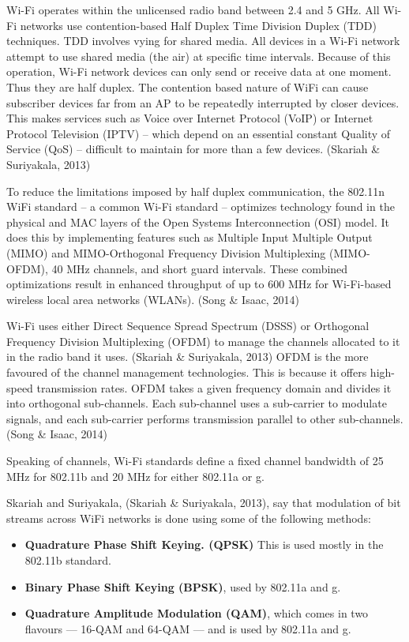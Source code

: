 \documentclass[12pt,svgnames,smaller]{article} %
\begin{document}
\begin{enumerate}
		Wi-Fi operates within the unlicensed radio band between 2.4 and 5 GHz. All Wi-Fi networks use contention-based Half Duplex Time Division Duplex (TDD) techniques. TDD involves vying for shared media. All devices in a Wi-Fi network attempt to use shared media (the air) at specific time intervals. Because of this operation, Wi-Fi network devices can only send or receive data at one moment. Thus they are half duplex. The contention based nature of WiFi can cause subscriber devices far from an AP to be repeatedly interrupted by closer devices. This makes services such as Voice over Internet Protocol (VoIP) or Internet Protocol Television (IPTV) – which depend on an essential constant Quality of Service (QoS) – difficult to maintain for more than a few devices. (Skariah \& Suriyakala, 2013)
		
		To reduce the limitations imposed by half duplex communication, the 802.11n WiFi standard – a common Wi-Fi standard – optimizes technology found in the physical and MAC layers of the Open Systems Interconnection (OSI) model. It does this by implementing features such as Multiple Input Multiple Output (MIMO) and MIMO-Orthogonal Frequency Division Multiplexing (MIMO-OFDM), 40 MHz channels, and short guard intervals. These combined optimizations result in enhanced throughput of up to 600 MHz for Wi-Fi-based wireless local area networks (WLANs). (Song \& Isaac, 2014)
		
		Wi-Fi uses either Direct Sequence Spread Spectrum (DSSS) or Orthogonal Frequency Division Multiplexing (OFDM) to manage the channels allocated to it in the radio band it uses. (Skariah \& Suriyakala, 2013) OFDM is the more favoured of the channel management technologies. This is because it offers high-speed transmission rates. OFDM takes a given frequency domain and divides it into orthogonal sub-channels. Each sub-channel uses a sub-carrier to modulate signals, and each sub-carrier performs transmission parallel to other sub-channels. (Song \& Isaac, 2014)
		
		Speaking of channels, Wi-Fi standards define a fixed channel bandwidth of 25 MHz for 802.11b and 20 MHz for either 802.11a or g.
		
		Skariah and Suriyakala, (Skariah \& Suriyakala, 2013), say that modulation of bit streams across WiFi networks is done using some of the following methods:
		
		\begin{itemize}
			\item \textbf{Quadrature Phase Shift Keying. (QPSK)} This is used mostly in the 802.11b standard.
			\item \textbf{Binary Phase Shift Keying (BPSK)}, used by 802.11a and g.
			\item \textbf{Quadrature Amplitude Modulation (QAM)}, which comes in two flavours --- 16-QAM and 64-QAM --- and is used by 802.11a and g.
		\end{itemize}
		

\end{enumerate}
\end{document}
